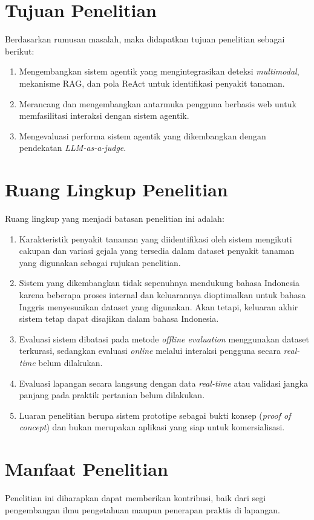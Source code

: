 \section{Tujuan Penelitian}
Berdasarkan rumusan masalah, maka didapatkan tujuan penelitian sebagai berikut:
\begin{enumerate}[nosep]
    \item Mengembangkan sistem agentik yang mengintegrasikan deteksi \textit{multimodal}, mekanisme RAG, dan pola ReAct untuk identifikasi penyakit tanaman.
    \item Merancang dan mengembangkan antarmuka pengguna berbasis web untuk memfasilitasi interaksi dengan sistem agentik.
    \item Mengevaluasi performa sistem agentik yang dikembangkan dengan pendekatan \textit{LLM-as-a-judge}.
\end{enumerate}

\section{Ruang Lingkup Penelitian}
Ruang lingkup yang menjadi batasan penelitian ini adalah: 
\begin{enumerate}[nosep]
    \item Karakteristik penyakit tanaman yang diidentifikasi oleh sistem mengikuti cakupan dan variasi gejala yang tersedia dalam dataset penyakit tanaman yang digunakan sebagai rujukan penelitian.
    \item Sistem yang dikembangkan tidak sepenuhnya mendukung bahasa Indonesia karena beberapa proses internal dan keluarannya dioptimalkan untuk bahasa Inggris menyesuaikan dataset yang digunakan. Akan tetapi, keluaran akhir sistem tetap dapat disajikan dalam bahasa Indonesia.
    \item Evaluasi sistem dibatasi pada metode \textit{offline evaluation} menggunakan dataset terkurasi, sedangkan evaluasi \textit{online} melalui interaksi pengguna secara \textit{real-time} belum dilakukan.
    \item Evaluasi lapangan secara langsung dengan data \textit{real-time} atau validasi jangka panjang pada praktik pertanian belum dilakukan.
    \item Luaran penelitian berupa sistem prototipe sebagai bukti konsep (\textit{proof of concept}) dan bukan merupakan aplikasi yang siap untuk komersialisasi.
\end{enumerate}

\section{Manfaat Penelitian} 
Penelitian ini diharapkan dapat memberikan kontribusi, baik dari segi pengembangan ilmu pengetahuan maupun penerapan praktis di lapangan.


